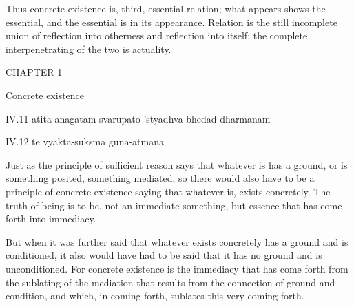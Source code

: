 Thus concrete existence is, third, essential relation;
what appears shows the essential,
and the essential is in its appearance.
Relation is the still incomplete union of
reflection into otherness and reflection into itself;
the complete interpenetrating of the two is actuality.

CHAPTER 1

Concrete existence

IV.11
atita-anagatam svarupato 'styadhva-bhedad dharmanam

IV.12
te vyakta-suksma guna-atmana

Just as the principle of sufficient reason says
that whatever is has a ground,
or is something posited, something mediated,
so there would also have to be
a principle of concrete existence saying
that whatever is, exists concretely.
The truth of being is to be, not an immediate something,
but essence that has come forth into immediacy.

But when it was further said
that whatever exists concretely
has a ground and is conditioned,
it also would have had to be said
that it has no ground and is unconditioned.
For concrete existence is the immediacy
that has come forth from the sublating
of the mediation that results
from the connection of ground and condition,
and which, in coming forth,
sublates this very coming forth.

